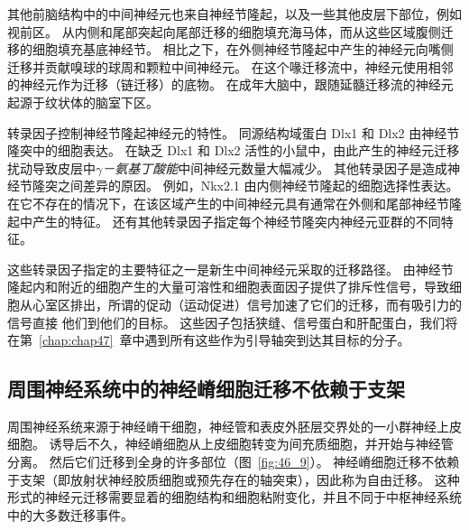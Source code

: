 其他前脑结构中的中间神经元也来自神经节隆起，以及一些其他皮层下部位，例如视前区。
从内侧和尾部突起向尾部迁移的细胞填充海马体，而从这些区域腹侧迁移的细胞填充基底神经节。
相比之下，在外侧神经节隆起中产生的神经元向嘴侧迁移并贡献嗅球的球周和颗粒中间神经元。
在这个喙迁移流中，神经元使用相邻的神经元作为迁移（链迁移）的底物。
在成年大脑中，跟随延髓迁移流的神经元起源于纹状体的脑室下区。


转录因子控制神经节隆起神经元的特性。
同源结构域蛋白 Dlx1 和 Dlx2 由神经节隆突中的细胞表达。
在缺乏 Dlx1 和 Dlx2 活性的小鼠中，由此产生的神经元迁移扰动导致皮层中\textit{$\gamma$－氨基丁酸能}中间神经元数量大幅减少。
其他转录因子是造成神经节隆突之间差异的原因。
例如，Nkx2.1 由内侧神经节隆起的细胞选择性表达。
在它不存在的情况下，在该区域产生的中间神经元具有通常在外侧和尾部神经节隆起中产生的特征。
还有其他转录因子指定每个神经节隆突内神经元亚群的不同特征。


这些转录因子指定的主要特征之一是新生中间神经元采取的迁移路径。
由神经节隆起内和附近的细胞产生的大量可溶性和细胞表面因子提供了排斥性信号，导致细胞从心室区排出，所谓的促动（运动促进）信号加速了它们的迁移，而有吸引力的信号直接 他们到他们的目标。
这些因子包括狭缝、信号蛋白和肝配蛋白，我们将在第~\ref{chap:chap47}~章中遇到所有这些作为引导轴突到达其目标的分子。



\subsection{周围神经系统中的神经嵴细胞迁移不依赖于支架}

周围神经系统来源于神经嵴干细胞，神经管和表皮外胚层交界处的一小群神经上皮细胞。
诱导后不久，神经嵴细胞从上皮细胞转变为间充质细胞，并开始与神经管分离。
然后它们迁移到全身的许多部位（图~\ref{fig:46_9}）。
神经嵴细胞迁移不依赖于支架（即放射状神经胶质细胞或预先存在的轴突束），因此称为自由迁移。
这种形式的神经元迁移需要显着的细胞结构和细胞粘附变化，并且不同于中枢神经系统中的大多数迁移事件。


